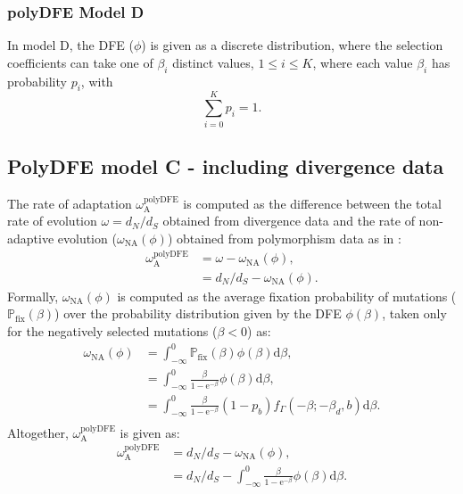 \documentclass{article}
\newcommand{\der}{\mathrm{d}}
\newcommand{\e}{\mathrm{e}}
\newcommand{\dn}{d_N}
\newcommand{\ds}{d_S}
\newcommand{\dnds}{\dn / \ds}
\newcommand{\rateApop}{\omega_{\mathrm{A}}}
\newcommand{\proba}{\mathbb{P}}
\newcommand{\pfix}{\proba_{\mathrm{fix}}}
\newcommand{\Spop}{\beta}
\begin{document}
    \subsubsection*{polyDFE Model D}
    In model D, the DFE ($\phi$) is given as a discrete distribution, where the selection coefficients can take one of $\Spop_i$ distinct
    values, $1 \leq i \leq K$, where each value $\Spop_i$ has probability $p_i$, with
    \begin{equation}
        \sum\limits_{i=0}^{K} p_i = 1.
    \end{equation}

    \subsection{PolyDFE model C - including divergence data}
    The rate of adaptation $\rateApop^{\mathrm{polyDFE}}$ is computed as the difference between the total rate of evolution $\omega=\dnds$ obtained from divergence data and the rate of non-adaptive evolution ($\omega_{\mathrm{NA}}(\phi)$) obtained from polymorphism data as in \textcite{tataru_inference_2017}:
    \begin{align}
        \rateApop^{\mathrm{polyDFE}} &= \omega - \omega_{\mathrm{NA}}(\phi), \\
        &= \dnds - \omega_{\mathrm{NA}}(\phi).
    \end{align}
    Formally, $\omega_{\mathrm{NA}}(\phi)$ is computed as the average fixation probability of mutations ($\pfix (\Spop)$) over the probability distribution given by the DFE $\phi (\Spop)$, taken only for the negatively selected mutations ($\Spop < 0$) as:
    \begin{align}
        \omega_{\mathrm{NA}}(\phi) &= \int_{-\infty}^{0} \pfix (\Spop) \phi (\Spop) \der \Spop, \\
        &= \int_{-\infty}^{0} \frac{\Spop}{1 - \e^{-\Spop}} \phi (\Spop) \der \Spop, \\
        &= \int_{-\infty}^{0} \frac{\Spop}{1 - \e^{-\Spop}} \left( 1 - p_b \right) f_{\Gamma}(-\Spop; -\Spop_d, b) \der \Spop. \\
    \end{align}
    Altogether, $\rateApop^{\mathrm{polyDFE}}$ is given as:
    \begin{align}
        \rateApop^{\mathrm{polyDFE}} &= \dnds - \omega_{\mathrm{NA}}(\phi), \\
        &= \dnds - \int_{-\infty}^{0} \frac{\Spop}{1 - \e^{-\Spop}} \phi (\Spop) \der \Spop.
    \end{align}
    
\end{document}
